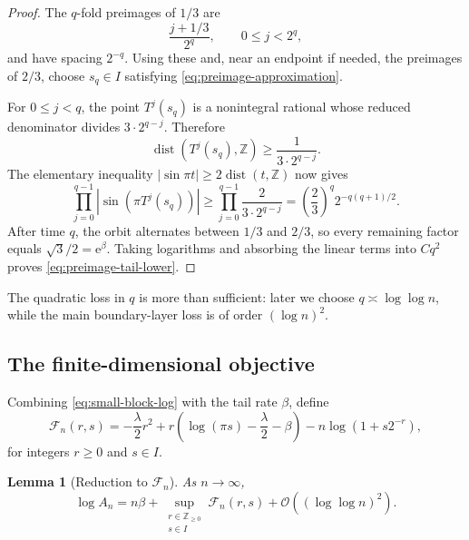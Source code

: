 \documentclass[11pt,oneside]{article}
\newtheorem{lemma}[lemma]{Lemma}
\theoremstyle{definition}
\theoremstyle{remark}
\newcommand{\Z}{\mathbb Z}
\newcommand{\e}{\mathrm e}
\newcommand{\bigO}{\mathcal O}
\newcommand{\dist}{\operatorname{dist}}
\begin{document}
\begin{proof}
The \(q\)-fold preimages of \(1/3\) are
\[
 \frac{j+1/3}{2^q},
 \qquad 0\le j<2^q,
\]
and have spacing \(2^{-q}\).  Using these and, near an endpoint if needed,
the preimages of \(2/3\), choose \(s_q\in I\) satisfying
\eqref{eq:preimage-approximation}.

For \(0\le j<q\), the point \(T^j(s_q)\) is a nonintegral rational whose
reduced denominator divides \(3\cdot2^{q-j}\).  Therefore
\[
 \dist(T^j(s_q),\Z)\ge\frac{1}{3\cdot2^{q-j}}.
\]
The elementary inequality
\(
 |\sin\pi t|\ge2\dist(t,\Z)
\)
now gives
\[
 \prod_{j=0}^{q-1}|\sin(\pi T^j(s_q))|
 \ge\prod_{j=0}^{q-1}\frac{2}{3\cdot2^{q-j}}
 =\left(\frac23\right)^q2^{-q(q+1)/2}.
\]
After time \(q\), the orbit alternates between \(1/3\) and \(2/3\), so every
remaining factor equals \(\sqrt3/2=\e^\beta\).  Taking logarithms and
absorbing the linear terms into \(Cq^2\) proves
\eqref{eq:preimage-tail-lower}.
\end{proof}

The quadratic loss in \(q\) is more than sufficient: later we choose
\(q\asymp\log\log n\), while the main boundary-layer loss is of order
\((\log n)^2\).

\subsection{The finite-dimensional objective}

Combining \eqref{eq:small-block-log} with the tail rate \(\beta\), define
\begin{equation}
 \mathcal F_n(r,s)=
 -\frac{\lambda}{2}r^2
 +r\left(\log(\pi s)-\frac\lambda2-\beta\right)
 -n\log(1+s2^{-r}),
 \label{eq:Fn-exact}
\end{equation}
for integers \(r\ge0\) and \(s\in I\).

\begin{lemma}[Reduction to \(\mathcal F_n\)]
\label{lem:An-Fn-reduction}
As \(n\to\infty\),
\begin{equation}
 \log A_n
 =n\beta+
 \sup_{\substack{r\in\Z_{\ge0}\\s\in I}}
 \mathcal F_n(r,s)
 +\bigO\!\left((\log\log n)^2\right).
 \label{eq:An-Fn-reduction}
\end{equation}
\end{lemma}
\end{document}
